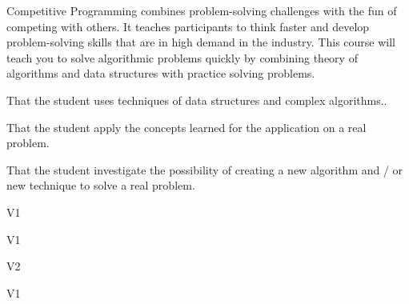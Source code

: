 \begin{syllabus}


\begin{justification}
    Competitive Programming combines problem-solving challenges with the fun of competing with others. It teaches participants to think faster and develop problem-solving skills that are in high demand in the industry.
    This course will teach you to solve algorithmic problems quickly by combining theory of algorithms and data structures with practice solving problems.
  \end{justification}
  
  \begin{goals}
    \item That the student uses techniques of data structures and complex algorithms..
    \item That the student apply the concepts learned for the application on a real problem.
    \item That the student investigate the possibility of creating a new algorithm and / or new technique to solve a real problem.
  \end{goals}
  
  \begin{outcomes}{V1}
      \item {}
      \item {}
      \item {}
  \end{outcomes}
  
  \begin{specificoutcomes}{V1}
    \item {}
    \item {}
  \end{specificoutcomes}

  \begin{outcomes}{V2}
      \item {}
      \item {}
      \item {}
      \item {}
  \end{outcomes}
  
  \begin{competences}{V1}
      \item {}
      \item {}
      \item {}
  \end{competences}
  

\end{syllabus}
